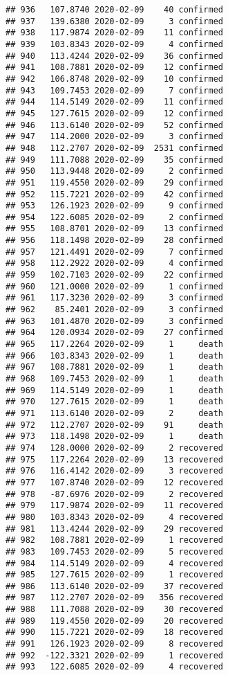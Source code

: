 \documentclass[
]{article}
\begin{document}
\begin{verbatim}
## 936   107.8740 2020-02-09    40 confirmed
## 937   139.6380 2020-02-09     3 confirmed
## 938   117.9874 2020-02-09    11 confirmed
## 939   103.8343 2020-02-09     4 confirmed
## 940   113.4244 2020-02-09    36 confirmed
## 941   108.7881 2020-02-09    12 confirmed
## 942   106.8748 2020-02-09    10 confirmed
## 943   109.7453 2020-02-09     7 confirmed
## 944   114.5149 2020-02-09    11 confirmed
## 945   127.7615 2020-02-09    12 confirmed
## 946   113.6140 2020-02-09    52 confirmed
## 947   114.2000 2020-02-09     3 confirmed
## 948   112.2707 2020-02-09  2531 confirmed
## 949   111.7088 2020-02-09    35 confirmed
## 950   113.9448 2020-02-09     2 confirmed
## 951   119.4550 2020-02-09    29 confirmed
## 952   115.7221 2020-02-09    42 confirmed
## 953   126.1923 2020-02-09     9 confirmed
## 954   122.6085 2020-02-09     2 confirmed
## 955   108.8701 2020-02-09    13 confirmed
## 956   118.1498 2020-02-09    28 confirmed
## 957   121.4491 2020-02-09     7 confirmed
## 958   112.2922 2020-02-09     4 confirmed
## 959   102.7103 2020-02-09    22 confirmed
## 960   121.0000 2020-02-09     1 confirmed
## 961   117.3230 2020-02-09     3 confirmed
## 962    85.2401 2020-02-09     3 confirmed
## 963   101.4870 2020-02-09     3 confirmed
## 964   120.0934 2020-02-09    27 confirmed
## 965   117.2264 2020-02-09     1     death
## 966   103.8343 2020-02-09     1     death
## 967   108.7881 2020-02-09     1     death
## 968   109.7453 2020-02-09     1     death
## 969   114.5149 2020-02-09     1     death
## 970   127.7615 2020-02-09     1     death
## 971   113.6140 2020-02-09     2     death
## 972   112.2707 2020-02-09    91     death
## 973   118.1498 2020-02-09     1     death
## 974   128.0000 2020-02-09     2 recovered
## 975   117.2264 2020-02-09    13 recovered
## 976   116.4142 2020-02-09     3 recovered
## 977   107.8740 2020-02-09    12 recovered
## 978   -87.6976 2020-02-09     2 recovered
## 979   117.9874 2020-02-09    11 recovered
## 980   103.8343 2020-02-09     4 recovered
## 981   113.4244 2020-02-09    29 recovered
## 982   108.7881 2020-02-09     1 recovered
## 983   109.7453 2020-02-09     5 recovered
## 984   114.5149 2020-02-09     4 recovered
## 985   127.7615 2020-02-09     1 recovered
## 986   113.6140 2020-02-09    37 recovered
## 987   112.2707 2020-02-09   356 recovered
## 988   111.7088 2020-02-09    30 recovered
## 989   119.4550 2020-02-09    20 recovered
## 990   115.7221 2020-02-09    18 recovered
## 991   126.1923 2020-02-09     8 recovered
## 992  -122.3321 2020-02-09     1 recovered
## 993   122.6085 2020-02-09     4 recovered

\end{verbatim}
\end{document}
